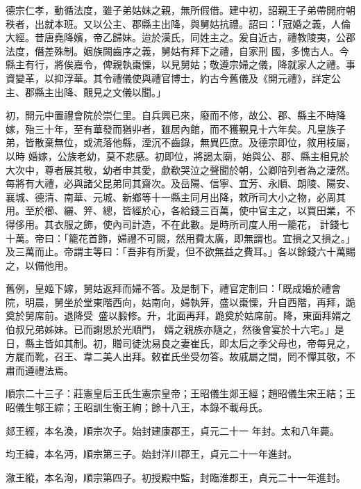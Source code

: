 \begin{pinyinscope}
 德宗仁孝，動循法度，雖子弟姑妹之親，無所假借。建中初，詔親王子弟帶開府朝秩者，出就本班。又以公主、郡縣主出降，與舅姑抗禮。詔曰：「冠婚之義，人倫大經。昔唐堯降嬪，帝乙歸妹。迨於漢氏，同姓主之。爰自近古，禮教陵夷，公郡法度，僭差殊制。姻族闕齒序之義，舅姑有拜下之禮，自家刑
 國，多愧古人。今縣主有行，將俟嘉令，俾親執棗慄，以見舅姑；敬遵宗婦之儀，降就家人之禮。事資變革，以抑浮華。其令禮儀使與禮官博士，約古今舊儀及《開元禮》，詳定公主、郡縣主出降、覿見之文儀以聞。」



 初，開元中置禮會院於崇仁里。自兵興已來，廢而不修，故公、郡、縣主不時降嫁，殆三十年，至有華發而猶丱者，雖居內館，而不獲覲見十六年矣。凡皇族子弟，皆散棄無位，或流落他縣，湮沉不齒錄，無異匹庶。及德宗即位，敘用枝屬，以時
 婚嫁，公族老幼，莫不悲感。初即位，將謁太廟，始與公、郡、縣主相見於大次中，尊者展其敬，幼者申其愛，歔欷哭泣之聲聞於朝，公卿陪列者為之淒然。每將有大禮，必與諸父昆弟同其齋次。及岳陽、信寧、宜芳、永順、朗陵、陽安、襄城、德清、南華、元城、新鄉等十一縣主同月出降，敕所司大小之物，必周其用。至於櫛、纚、笄、總，皆經於心，各給錢三百萬，使中官主之，以買田業，不得侈用。其衣服之飾，使內司計造，不在此數。是時所司度人用一籠花，
 計錢七十萬。帝曰：「籠花首飾，婦禮不可闕，然用費太廣，即無謂也。宜損之又損之。」及三萬而止。帝謂主等曰：「吾非有所愛，但不欲無益之費耳。」各以餘錢六十萬賜之，以備他用。



 舊例，皇姬下嫁，舅姑返拜而婦不答。及是制下，禮官定制曰：「既成婚於禮會院，明晨，舅坐於堂東階西向，姑南向，婦執笄，盛以棗慄，升自西階，再拜，跪奠於舅席前。退降受，盛以腶修。升，北面再拜，跪奠於姑席前。降，東面拜婿之伯叔兄弟姊妹。已而謝恩於光順門，
 婿之親族亦隨之，然後會宴於十六宅。」是日，縣主皆如其制。初，贈司徒沈易良之妻崔氏，即太后之季父母也，帝每見之，方屣而靴，召王、韋二美人出拜。敕崔氏坐受勿答。故戚屬之間，罔不憚其敬，不肅而遵禮法焉。



 順宗二十三子：莊憲皇后王氏生憲宗皇帝；王昭儀生郯王經；趙昭儀生宋王結；王昭儀生郇王綜；王昭訓生衡王絢；餘十八王，本錄不載母氏。



 郯王經，本名渙，順宗次子。始封建康郡王，貞元二十一
 年封。太和八年薨。



 均王緯，本名沔，順宗第三子。始封洋川郡王，貞元二十一年進封。



 漵王縱，本名洵，順宗第四子。初授殿中監，封臨淮郡王，貞元二十一年進封。




\end{pinyinscope}
